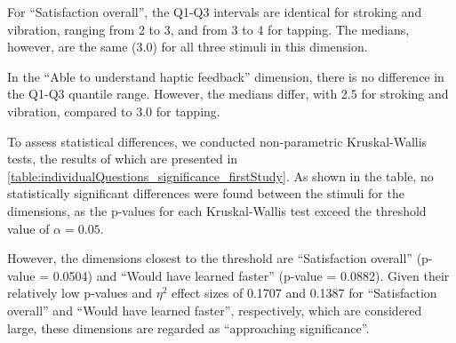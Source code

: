 For \enquote{Satisfaction overall}, the Q1-Q3 intervals are identical for stroking and vibration, ranging from 2 to 3, and from 3 to 4 for tapping. The medians, however, are the same (3.0) for all three stimuli in this dimension.

In the \enquote{Able to understand haptic feedback} dimension, there is no difference in the Q1-Q3 quantile range. However, the medians differ, with 2.5 for stroking and vibration, compared to 3.0 for tapping.


To assess statistical differences, we conducted non-parametric Kruskal-Wallis tests, the results of which are presented in \autoref{table:individualQuestions_significance_firstStudy}.
As shown in the table, no statistically significant differences were found between the stimuli for the dimensions, as the p-values for each Kruskal-Wallis test exceed the threshold value of $\alpha=0.05$.

However, the dimensions closest to the threshold are \enquote{Satisfaction overall} (p-value = 0.0504) and \enquote{Would have learned faster} (p-value = 0.0882). Given their relatively low p-values and \(\eta^2\) effect sizes of 0.1707 and 0.1387 for \enquote{Satisfaction overall} and \enquote{Would have learned faster}, respectively, which are considered large, these dimensions are regarded as \enquote{approaching significance}.


\begin{table}[ht]
\caption{Results of the Kruskal-Wallis significance tests for the different self-assessment dimensions with a $\eta^2$ Effect Size.}
\label{table:individualQuestions_significance_firstStudy}
\end{table}





